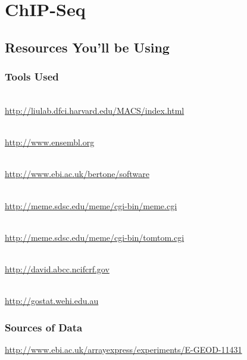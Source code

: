 \renewcommand{\moduleTitle}{ChIP-Seq}
\renewcommand{\moduleAuthors}{%
  Remco Loos, EMBL-EBI \mailto{remco@ebi.ac.uk} \\
  Myrto Kostadima \mailto{kostadim@ebi.ac.uk}
} \renewcommand{\moduleContributions}{%
  Xi Li \mailto{sean.li@csiro.au}%
}

\chapter{\moduleTitle}
\newpage

\section{Resources You'll be Using}
 
\subsection{Tools Used}
\begin{description}[style=multiline,labelindent=0cm,align=left,leftmargin=0.5cm]
  \item[MACS]\hfill\\
  	\url{http://liulab.dfci.harvard.edu/MACS/index.html}
  \item[Ensembl]\hfill\\
  	\url{http://www.ensembl.org}
  \item[PeakAnalyzer]\hfill\\
  	\url{http://www.ebi.ac.uk/bertone/software}
  \item[MEME]\hfill\\
  	\url{http://meme.sdsc.edu/meme/cgi-bin/meme.cgi}
  \item[TOMTOM]\hfill\\
  	\url{http://meme.sdsc.edu/meme/cgi-bin/tomtom.cgi}  
  \item[DAVID]\hfill\\
  	\url{http://david.abcc.ncifcrf.gov}
  \item[GOstat]\hfill\\
    \url{http://gostat.wehi.edu.au}
\end{description}

\subsection{Sources of Data}
  \url{http://www.ebi.ac.uk/arrayexpress/experiments/E-GEOD-11431}

